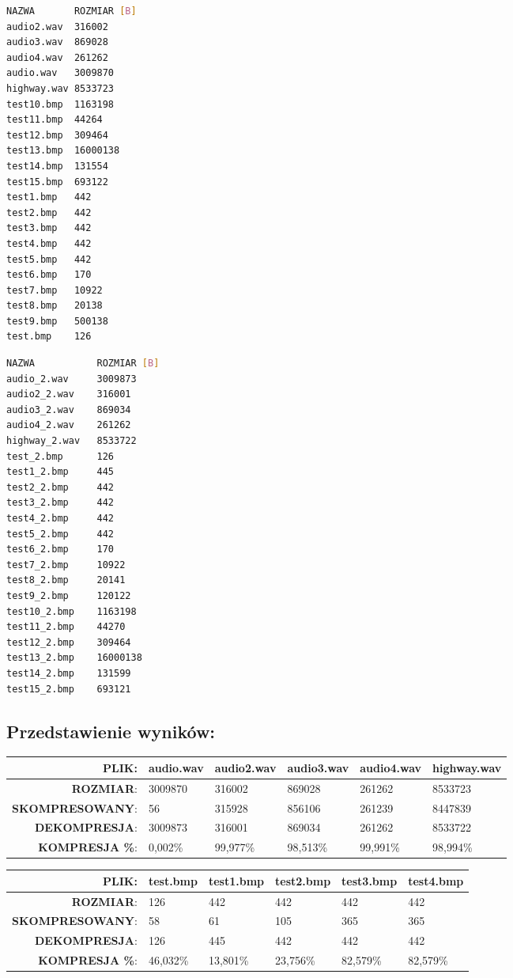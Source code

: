 \documentclass[12pt,a4paper,notitlepage]{report}
\begin{document}
\begin{minipage}{.48\textwidth}
\begin{lstlisting}[language=bash,caption={Przedstawienie plików przed kompresją.}]
NAZWA		ROZMIAR [B]
audio2.wav	316002
audio3.wav	869028
audio4.wav	261262
audio.wav	3009870
highway.wav	8533723
test10.bmp	1163198
test11.bmp	44264
test12.bmp	309464
test13.bmp	16000138
test14.bmp	131554
test15.bmp	693122
test1.bmp	442
test2.bmp	442
test3.bmp	442
test4.bmp	442
test5.bmp	442
test6.bmp	170
test7.bmp	10922
test8.bmp	20138
test9.bmp	500138
test.bmp	126
\end{lstlisting}
\end{minipage}
\hfill
\begin{minipage}{.48\textwidth}
\begin{lstlisting}[language=bash,caption={Przedstawienie plików po dekompresji.}]
NAZWA			ROZMIAR [B]
audio_2.wav		3009873
audio2_2.wav	316001
audio3_2.wav	869034
audio4_2.wav	261262
highway_2.wav	8533722
test_2.bmp		126
test1_2.bmp		445
test2_2.bmp		442
test3_2.bmp		442
test4_2.bmp		442
test5_2.bmp		442
test6_2.bmp		170
test7_2.bmp		10922
test8_2.bmp		20141
test9_2.bmp		120122
test10_2.bmp	1163198
test11_2.bmp	44270
test12_2.bmp	309464
test13_2.bmp	16000138
test14_2.bmp	131599
test15_2.bmp	693121
\end{lstlisting}
\end{minipage}

\subsection{Przedstawienie wyników:}
\begin{table}[H]
\begin{tabular}{r|l|l|l|l|l|}\hline
\textbf{PLIK}:	&	audio.wav	&	audio2.wav	&	audio3.wav	&	audio4.wav	&	highway.wav	\\\hline
\textbf{ROZMIAR}:	&	3009870	&	316002	&	869028	&	261262	&	8533723	\\\hline
\textbf{SKOMPRESOWANY}:	&	56	&	315928	&	856106	&	261239	&	8447839	\\\hline
\textbf{DEKOMPRESJA}:	&	3009873	&	316001	&	869034	&	261262	&	8533722	\\\hline
\textbf{KOMPRESJA \%}:	&	0,002\%	&	99,977\%	&	98,513\%	&	99,991\%	&	98,994\%	\\\hline
\end{tabular}
\end{table}

\begin{table}[H]
\begin{tabular}{r|l|l|l|l|l|}\hline
\textbf{PLIK}:	&	test.bmp	&	test1.bmp	&	test2.bmp	&	test3.bmp	&	test4.bmp	\\\hline
\textbf{ROZMIAR}:	&	126	&	442	&	442	&	442	&	442	\\\hline
\textbf{SKOMPRESOWANY}:	&	58	&	61	&	105	&	365	&	365	\\\hline
\textbf{DEKOMPRESJA}:	&	126	&	445	&	442	&	442	&	442	\\\hline
\textbf{KOMPRESJA \%}:	&	46,032\%	&	13,801\%	&	23,756\%	&	82,579\%	&	82,579\%	\\\hline
\end{tabular}
\end{table}
\end{document}
